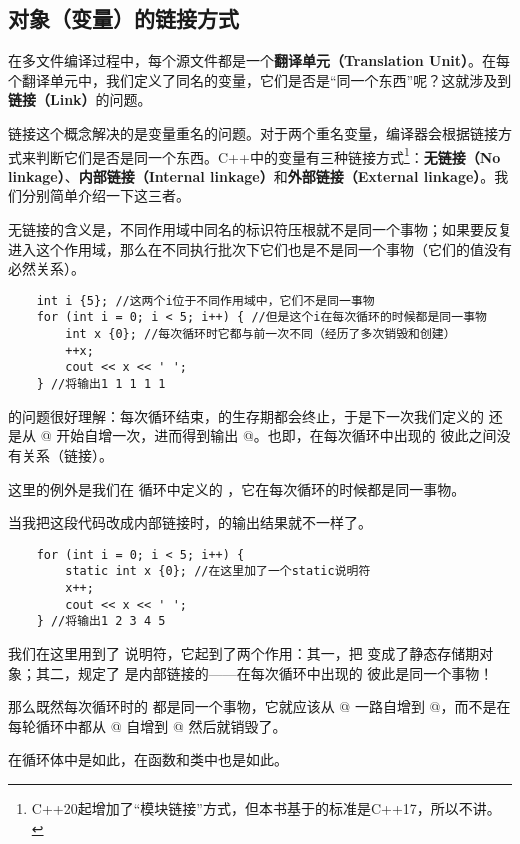 \subsection*{对象（变量）的链接方式}
在多文件编译过程中，每个源文件都是一个\textbf{翻译单元（Translation Unit）}。在每个翻译单元中，我们定义了同名的变量，它们是否是``同一个东西''呢？这就涉及到\textbf{链接（Link）}的问题。\par
链接这个概念解决的是变量重名的问题。对于两个重名变量，编译器会根据链接方式来判断它们是否是同一个东西。C++中的变量有三种链接方式\footnote{C++20起增加了``模块链接''方式，但本书基于的标准是C++17，所以不讲。}：\textbf{无链接（No linkage）}、\textbf{内部链接（Internal linkage）}和\textbf{外部链接（External linkage）}。我们分别简单介绍一下这三者。\par
无链接的含义是，不同作用域中同名的标识符压根就不是同一个事物；如果要反复进入这个作用域，那么在不同执行批次下它们也是不是同一个事物（它们的值没有必然关系）。
\begin{lstlisting}
    int i {5}; //这两个i位于不同作用域中，它们不是同一事物
    for (int i = 0; i < 5; i++) { //但是这个i在每次循环的时候都是同一事物
        int x {0}; //每次循环时它都与前一次不同（经历了多次销毁和创建）
        ++x;
        cout << x << ' ';
    } //将输出1 1 1 1 1
\end{lstlisting}
\lstinline@x@ 的问题很好理解：每次循环结束，\lstinline@x@ 的生存期都会终止，于是下一次我们定义的 \lstinline@x@ 还是从 @ 开始自增一次，进而得到输出 @。也即，在每次循环中出现的 \lstinline@x@ 彼此之间没有关系（链接）。\par
这里的例外是我们在 \lstinline@for@ 循环中定义的 \lstinline@i@，它在每次循环的时候都是同一事物。\par
当我把这段代码改成内部链接时，\lstinline@x@ 的输出结果就不一样了。
\begin{lstlisting}
    for (int i = 0; i < 5; i++) {
        static int x {0}; //在这里加了一个static说明符
        x++;
        cout << x << ' ';
    } //将输出1 2 3 4 5
\end{lstlisting}
我们在这里用到了 \lstinline@static@ 说明符，它起到了两个作用：其一，把 \lstinline@x@ 变成了静态存储期对象；其二，规定了 \lstinline@x@ 是内部链接的——在每次循环中出现的 \lstinline@x@ 彼此是同一个事物！\par
那么既然每次循环时的 \lstinline@x@ 都是同一个事物，它就应该从 @ 一路自增到 @，而不是在每轮循环中都从 @ 自增到 @ 然后就销毁了。\par
在循环体中是如此，在函数和类中也是如此。

